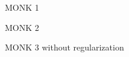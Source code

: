 \documentclass[11pt]{article}
\begin{document}
\begin{figure}[H]
    \centering
                \begin{subfigure}{0.9\textwidth}
                    \caption{MONK 1}
                    \label{fig:monk1}
                \end{subfigure}
                \begin{subfigure}{0.9\textwidth}
                    \caption{MONK 2}
                    \label{fig:monk2}
                \end{subfigure}
                \begin{subfigure}{0.9\textwidth}
                    \caption{MONK 3 without regularization}
                    \label{fig:monk3}
                \end{subfigure}
                \begin{subfigure}{0.9\textwidth}

\end{subfigure}
\end{figure}
\end{document}

